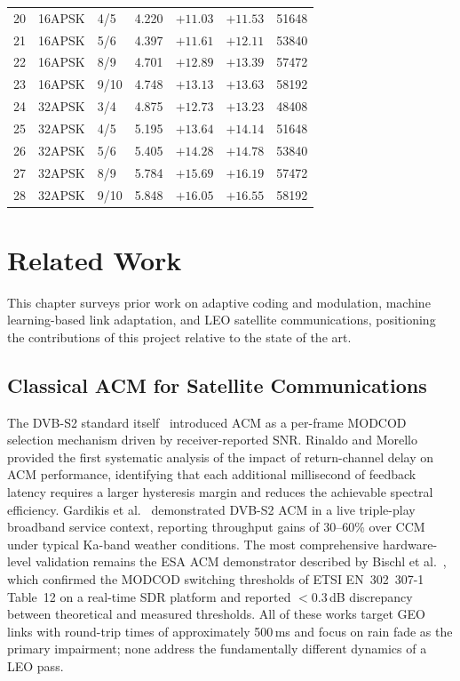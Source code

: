 \documentclass[12pt,a4paper]{report}
\begin{document}
\begin{table}[H]
\begin{tabular}{clllrrr}
20  & 16APSK  & 4/5  & 4.220 & $+11.03$& $+11.53$& 51648 \\
21  & 16APSK  & 5/6  & 4.397 & $+11.61$& $+12.11$& 53840 \\
22  & 16APSK  & 8/9  & 4.701 & $+12.89$& $+13.39$& 57472 \\
23  & 16APSK  & 9/10 & 4.748 & $+13.13$& $+13.63$& 58192 \\
\midrule
24  & 32APSK  & 3/4  & 4.875 & $+12.73$& $+13.23$& 48408 \\
25  & 32APSK  & 4/5  & 5.195 & $+13.64$& $+14.14$& 51648 \\
26  & 32APSK  & 5/6  & 5.405 & $+14.28$& $+14.78$& 53840 \\
27  & 32APSK  & 8/9  & 5.784 & $+15.69$& $+16.19$& 57472 \\
28  & 32APSK  & 9/10 & 5.848 & $+16.05$& $+16.55$& 58192 \\
\bottomrule
\end{tabular}
\end{table}

\chapter{Related Work}
\label{ch:related_work}

This chapter surveys prior work on adaptive coding and modulation, machine
learning-based link adaptation, and LEO satellite communications, positioning
the contributions of this project relative to the state of the art.

\section{Classical ACM for Satellite Communications}

The DVB-S2 standard itself~\cite{etsi_dvbs2} introduced ACM as a per-frame
MODCOD selection mechanism driven by receiver-reported SNR.  Rinaldo and
Morello~\cite{rinaldo2004} provided the first systematic analysis of the impact
of return-channel delay on ACM performance, identifying that each additional
millisecond of feedback latency requires a larger hysteresis margin and reduces
the achievable spectral efficiency.  Gardikis et al.~\cite{gardikis2008}
demonstrated DVB-S2 ACM in a live triple-play broadband service context,
reporting throughput gains of 30--60\% over CCM under typical Ka-band weather
conditions.  The most comprehensive hardware-level validation remains the ESA
ACM demonstrator described by Bischl et al.~\cite{bischl2010}, which confirmed
the MODCOD switching thresholds of ETSI EN~302~307-1 Table~12 on a real-time
SDR platform and reported $<$0.3\,dB discrepancy between theoretical and
measured thresholds.  All of these works target GEO links with round-trip times
of approximately 500\,ms and focus on rain fade as the primary impairment;
none address the fundamentally different dynamics of a LEO pass.
\end{document}
